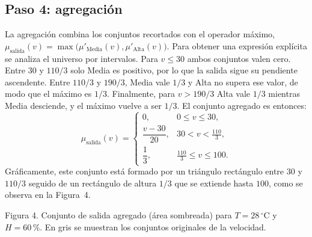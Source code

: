\documentclass[11pt]{article}
\begin{document}
\subsection{Paso 4: agregación}

La agregación combina los conjuntos recortados con el operador máximo, $\mu_{\text{salida}}(v) = \max\bigl(\mu'_{\text{Media}}(v), \mu'_{\text{Alta}}(v)\bigr)$. Para obtener una expresión explícita se analiza el universo por intervalos. Para $v \le 30$ ambos conjuntos valen cero. Entre $30$ y $110/3$ solo Media es positivo, por lo que la salida sigue su pendiente ascendente. Entre $110/3$ y $190/3$, Media vale $1/3$ y Alta no supera ese valor, de modo que el máximo es $1/3$. Finalmente, para $v > 190/3$ Alta vale $1/3$ mientras Media desciende, y el máximo vuelve a ser $1/3$. El conjunto agregado es entonces:
\[
\mu_{\text{salida}}(v) =
\begin{cases}
0, & 0 \le v \le 30, \\[4pt]
\dfrac{v - 30}{20}, & 30 < v < \frac{110}{3}, \\[8pt]
\dfrac{1}{3}, & \frac{110}{3} \le v \le 100.
\end{cases}
\]
Gráficamente, este conjunto está formado por un triángulo rectángulo entre $30$ y $110/3$ seguido de un rectángulo de altura $1/3$ que se extiende hasta $100$, como se observa en la Figura~4.

\begin{center}
\begin{minipage}{\textwidth}
\centering
{}\par
\small Figura 4. Conjunto de salida agregado (área sombreada) para $T = 28\,^\circ$C y $H = 60\,\%$. En gris se muestran los conjuntos originales de la velocidad.
\end{minipage}
\end{center}
\end{document}
